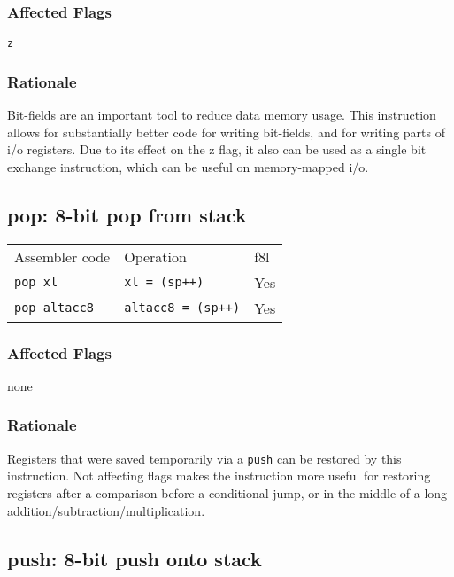 \documentclass{book}
\begin{document}
\subsubsection*{Affected Flags}

\texttt{z}

\subsubsection*{Rationale}

Bit-fields are an important tool to reduce data memory usage. This instruction allows for substantially better code for writing bit-fields, and for writing parts of i/o registers. Due to its effect on the z flag, it also can be used as a single bit exchange instruction, which can be useful on memory-mapped i/o.


\subsection{pop: 8-bit pop from stack}

\begin{tabular}{l l l}
Assembler code       & Operation                 & f8l \\
\texttt{pop xl}      & \texttt{xl = (sp++)}      & Yes \\
\texttt{pop altacc8} & \texttt{altacc8 = (sp++)} & Yes \\
\end{tabular}

\subsubsection*{Affected Flags}

none

\subsubsection*{Rationale}

Registers that were saved temporarily via a \texttt{push} can be restored by this instruction. Not affecting flags makes the instruction more useful for restoring registers after a comparison before a conditional jump, or in the middle of a long addition/subtraction/multiplication.


\subsection{push: 8-bit push onto stack}
\end{document}
